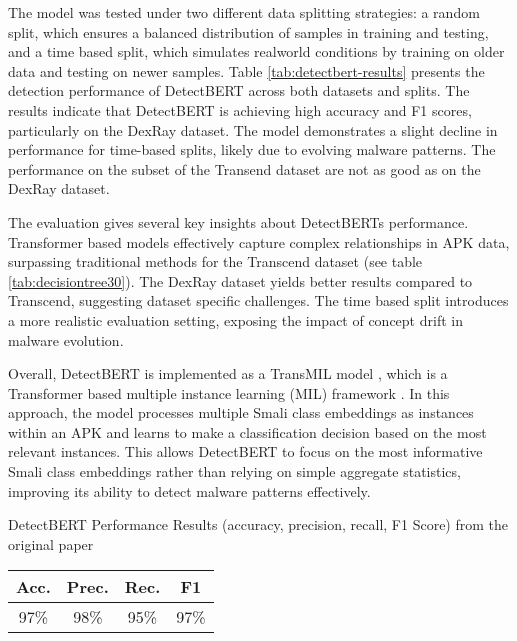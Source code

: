 The model was tested under two different data splitting strategies: a random split, 
which ensures a balanced distribution of samples in training and testing, 
and a time based split, which simulates realworld conditions by training on older 
data and testing on newer samples. 
Table \ref{tab:detectbert-results} presents the detection performance of DetectBERT across both datasets 
and splits. The results indicate that DetectBERT is
achieving high accuracy and F1 scores, particularly on the DexRay dataset. 
The model demonstrates a slight decline in performance for time-based splits, 
likely due to evolving malware patterns. 
The performance on the subset of the Transend dataset are not as good as 
on the DexRay dataset.

The evaluation gives several key insights about DetectBERTs performance. 
Transformer based models effectively capture complex relationships in APK data, 
surpassing traditional methods for the Transcend dataset (see table \ref{tab:decisiontree30}). 
The DexRay dataset yields better results compared 
to Transcend, suggesting dataset specific challenges. 
The time based split introduces a more realistic evaluation setting, 
exposing the impact of concept drift in malware evolution.

Overall, DetectBERT is implemented as a TransMIL model , which is a Transformer based 
multiple instance learning (MIL) framework \cite{transmil}. 
In this approach, the model processes 
multiple Smali class embeddings as instances within an APK and learns to make a 
classification decision based on the most relevant instances. This allows DetectBERT 
to focus on the most informative Smali class embeddings rather than relying on 
simple aggregate statistics, improving its ability to detect malware patterns effectively.

\begin{margintable}[-30\baselineskip]
    \caption{\label{tab:detectbert_performance_original} DetectBERT Performance Results (accuracy, precision, recall, F1 Score) from the original paper \cite{detectbert}}
    \footnotesize
    \begin{tabular*}{\linewidth}{@{\extracolsep{\fill}} cccc@{}}
        \toprule
        \textbf{Acc.} & \textbf{Prec.} & \textbf{Rec.} & \textbf{F1} \\
        \midrule
        97\% & 98\% & 95\% & 97\% \\
        \bottomrule
    \end{tabular*}
\end{margintable}




